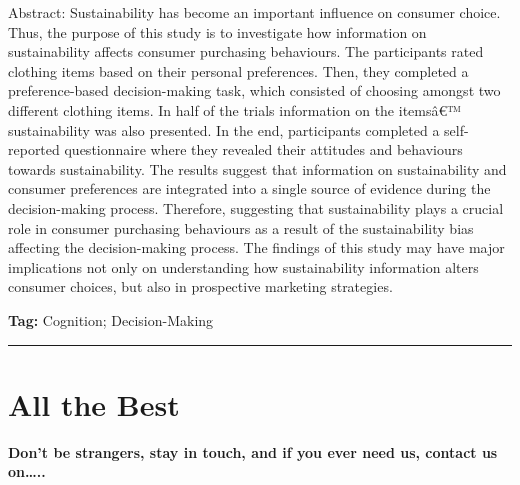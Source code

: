 \documentclass[]{book}
\begin{document}
Abstract: Sustainability has become an important influence on consumer choice. Thus, the purpose of this study is to investigate how information on sustainability affects consumer purchasing behaviours. The participants rated clothing items based on their personal preferences. Then, they completed a preference-based decision-making task, which consisted of choosing amongst two different clothing items. In half of the trials information on the itemsâ€™ sustainability was also presented. In the end, participants completed a self-reported questionnaire where they revealed their attitudes and behaviours towards sustainability. The results suggest that information on sustainability and consumer preferences are integrated into a single source of evidence during the decision-making process. Therefore, suggesting that sustainability plays a crucial role in consumer purchasing behaviours as a result of the sustainability bias affecting the decision-making process. The findings of this study may have major implications not only on understanding how sustainability information alters consumer choices, but also in prospective marketing strategies.

\textbf{Tag:} Cognition; Decision-Making

\begin{center}\rule{0.5\linewidth}{\linethickness}\end{center}

\hypertarget{all-the-best}{%
\chapter*{All the Best}\label{all-the-best}}

\textbf{Don't be strangers, stay in touch, and if you ever need us, contact us on\ldots{}..}


\end{document}
